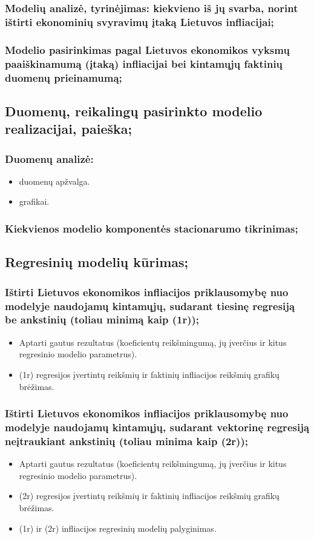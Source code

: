 \documentclass[a4paper]{article}
\begin{document}
\subsubsection{Modelių analizė, tyrinėjimas: kiekvieno iš jų svarba, norint ištirti ekonominių svyravimų įtaką Lietuvos infliacijai;}
\subsubsection{Modelio pasirinkimas pagal Lietuvos ekonomikos vyksmų paaiškinamumą (įtaką) infliacijai bei kintamųjų faktinių duomenų prieinamumą;}
\subsection{	Duomenų, reikalingų pasirinkto modelio realizacijai, paieška;}
\subsubsection{Duomenų analizė:}
\begin{itemize}
\item  duomenų apžvalga.
\item grafikai.
\end{itemize}
\subsubsection{Kiekvienos modelio komponentės stacionarumo tikrinimas;}
\subsection{Regresinių modelių kūrimas;}
\subsubsection{Ištirti Lietuvos ekonomikos infliacijos priklausomybę nuo modelyje naudojamų kintamųjų, sudarant tiesinę regresiją be ankstinių (toliau minimą kaip (1r));}
\begin{itemize}
\item Aptarti gautus rezultatus (koeficientų reikšmingumą, jų įverčius ir kitus regresinio modelio parametrus).
\item (1r) regresijos įvertintų reikšmių ir faktinių infliacijos reikšmių grafikų brėžimas.
\end{itemize}
\subsubsection{Ištirti Lietuvos ekonomikos infliacijos priklausomybę nuo modelyje naudojamų kintamųjų, sudarant vektorinę regresiją neįtraukiant ankstinių (toliau minima kaip (2r));}
\begin{itemize}
\item Aptarti gautus rezultatus (koeficientų reikšmingumą, jų įverčius ir kitus regresinio modelio parametrus).
\item (2r) regresijos įvertintų reikšmių ir faktinių infliacijos reikšmių grafikų brėžimas.
\item  (1r) ir (2r) infliacijos regresinių modelių palyginimas.
\end{itemize}
\end{document}
